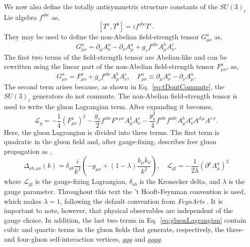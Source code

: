 We now also define the totally antisymmetric structure constants of the $SU(3)_c$ 
Lie algebra $f^{abc}$ as,
\begin{equation}\label{eq:tDontCommute}
    \left[T^a,T^b\right] = if^{abc}T^c.
\end{equation}
They may be used to define the non-Abelian field-strength tensor $G_{\mu\nu}^a$ as,
\begin{equation}
    G_{\mu\nu}^a = \partial_\mu A_\nu^a - \partial_\nu A_\mu^a + g_s f^{abc}A_\mu^b A_\nu^c.
\end{equation}
The first two terms of the field-strength tensor are Abelian-like and 
can be rewritten using the linear part of the non-Abelian 
field-strength tensor $F_{\mu\nu}^a$, as, 
\begin{equation}
    G_{\mu\nu}^a = F_{\mu\nu}^a + g_s f^{abc}A_\mu^b A_\nu^c,\quad F_{\mu\nu}^a\equiv\partial_\mu A_\nu^a - \partial_\nu A_\mu^a.
\end{equation}
The second term arises because, as shown in Eq.~\eqref{eq:tDontCommute}, the $SU(3)_c$ 
generators do not commute. The non-Abelian field-strength tensor is used to write 
the gluon Lagrangian term. After expanding it becomes,
\begin{equation}\label{eq:gluonLagrangian}
    \mathcal L_g = -\frac14\!\left(F_{\mu\nu}^a\right)^2-\frac{g_s}2f^{abc}F^{a\,\mu\nu}A_\mu^b A_\nu^c - \frac{g_s^2}4f^{abc}f^{ade}A_\mu^b A_\nu^c A^{d\,\mu}A^{e\,\nu}.
\end{equation}
Here, the gluon Lagrangian is divided into three terms. 
The first term is quadratic in the gluon field and, after gauge-fixing, 
describes free gluon propagation as \cite{Ellis:1996mzs},
\begin{equation}
    \Delta_{ab, \mu\nu}(k) = \delta_{ab}\frac i{k^2}\left(-g_{\mu\nu}+(1-\lambda)\frac{k_\mu k_\nu}{k^2}\right),\quad \mathcal L_\text{gf}=-\frac1{2\lambda}\!\left(\partial^\mu A_\mu^a\right)^2
\end{equation}
where $\mathcal L_\text{gf}$ is the gauge-fixing Lagrangian, $\delta_{ab}$ is the 
Kronecker delta, and $\lambda$ is the gauge parameter. 
Throughout this text the 't Hooft-Feynman convention is used, which makes $\lambda=1$,
following the default convention from \textit{FeynArts} \cite{Hahn:2000kx}. It is 
important to note, however, that physical observables are independent of the gauge 
choice. 
In addition, the last two terms in Eq.~\eqref{eq:gluonLagrangian} contain cubic and
quartic terms in the gluon fields that generate, respectively, the three- and
four-gluon self-interaction vertices, $ggg$ and $gggg$.

